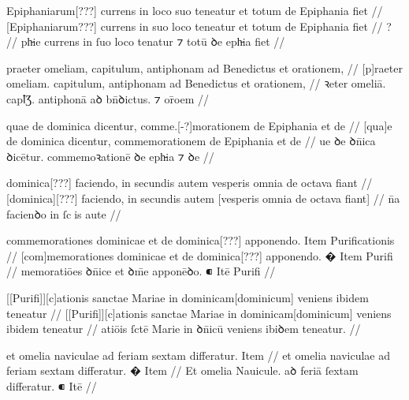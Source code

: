 \ex \bg
\gla
{}
 Epiphaniarum[???] currens in {} loco suo
teneatur et totum de Epiphania fiet
//
\glRekonstrukcja
{}
 [Epiphaniarum???] currens in suo loco {}
teneatur et totum de Epiphania fiet
//
\glUbytki
{?}
//
\glU
{}
ph̵ie currens in ſuo loco {} tenatur ⁊ totū ꝺe eph̵ia fiet
//
\endgl
\xe



\ex \bg
\gla
{}
praeter omeliam, capitulum, antiphonam ad Benedictus et orationem,
//
\glRekonstrukcja
{}
[p]raeter omeliam. capitulum, antiphonam ad Benedictus et orationem,
//
\glU
{}
ꝛeter omeliā. capꝉƷ. antiphonā aꝺ bn̄ꝺictus. ⁊ or̄oem
//
\endgl
\xe



\ex \bg
\gla
{}
quae de dominica dicentur, comme.[-?]morationem de Epiphania et de
//
\glRekonstrukcja
{}
[qua]e de dominica dicentur, commemorationem de Epiphania et de
//
\glU
{}
ue ꝺe ꝺn̄ica ꝺicētur. commemoꝛationē ꝺe eph̵ia ⁊ ꝺe
//
\endgl
\xe




\ex \bg
\gla
{}
dominica[???] faciendo, in secundis autem
vesperis omnia de octava fiant 
//
\glRekonstrukcja
{}
[dominica][???] faciendo, in secundis autem
[vesperis omnia de octava fiant]
//
\glU
{}
n̄a facienꝺo in ſcis aute     
//
\endgl
\xe



\ex \bg
\gla
{}
commemorationes dominicae et de dominica[???] apponendo.
{} Item Purificationis
//
\glRekonstrukcja
{}
[com]memorationes dominicae et de dominica[???] apponendo.
� Item Purifi
//
\glU
{}
memoratiōes ꝺn̄ice et {} ꝺm̄e apponēꝺo. ⁌ Itē Purifi
//
\endgl
\xe



\ex \bg
\gla
{}
[[Purifi]][c]ationis sanctae Mariae in dominicam[dominicum] veniens ibidem
teneatur
//
\glRekonstrukcja
{}
[[Purifi]][c]ationis sanctae Mariae in dominicam[dominicum] veniens ibidem
teneatur
//
\glU
{}
atiōis ſctē Marie in ꝺn̄icū veniens ibiꝺem teneatur.
//
\endgl
\xe



\ex \bg
\gla
{}
et omelia naviculae ad feriam sextam differatur.
{} Item
//
\glRekonstrukcja
{}
et omelia naviculae ad feriam sextam differatur.
{�} Item
//
\glU
{}
Et omelia Nauicule. aꝺ feriā ſextam diﬀeratur. ⁌ Itē
//
\endgl
\xe



